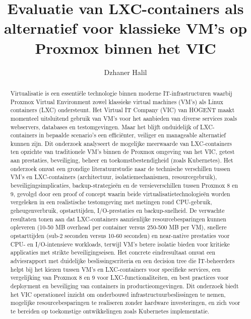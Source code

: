 \documentclass{hogent-article}
\title{Evaluatie van LXC-containers als alternatief voor klassieke VM's op Proxmox binnen het VIC}
\author{Dzhaner Halil}
\begin{document}
\begin{abstract}
Virtualisatie is een essentiële technologie binnen moderne IT-infrastructuren waarbij Proxmox Virtual Environment zowel klassieke virtual machines (VM's) als Linux containers (LXC) ondersteunt. Het Virtual IT Company (VIC) van HOGENT maakt momenteel uitsluitend gebruik van VM's voor het aanbieden van diverse services zoals webservers, databases en testomgevingen. Maar het blijft onduidelijk of LXC-containers in bepaalde scenario's een efficiënter, veiliger en manageable alternatief kunnen zijn. Dit onderzoek analyseert de mogelijke meerwaarde van LXC-containers ten opzichte van traditionele VM's binnen de Proxmox omgeving van het VIC, getest aan prestaties, beveiliging, beheer en toekomstbestendigheid (zoals Kubernetes). Het onderzoek omvat een grondige literatuurstudie naar de technische verschillen tussen VM's en LXC-containers (architectuur, isolatiemechanismen, resourcegebruik), beveiligingsimplicaties, backup-strategieën en de versieverschillen tussen Proxmox 8 en 9, gevolgd door een proof of concept waarin beide virtualisatietechnologieën worden vergeleken in een realistische testomgeving met metingen rond CPU-gebruik, geheugenverbruik, opstarttijden, I/O-prestaties en backup-snelheid. De verwachte resultaten tonen aan dat LXC-containers aanzienlijke resourcebesparingen kunnen opleveren (10-50 MB overhead per container versus 250-500 MB per VM), snellere opstarttijden (sub-2 seconden versus 10-60 seconden) en near-native prestaties voor CPU- en I/O-intensieve workloads, terwijl VM's betere isolatie bieden voor kritieke applicaties met strikte beveiligingseisen. Het concrete eindresultaat omvat een adviesrapport met duidelijke beslissingscriteria en een decision tree die IT-beheerders helpt bij het kiezen tussen VM's en LXC-containers voor specifieke services, een vergelijking van Proxmox 8 en 9 voor LXC-functionaliteiten, en best practices voor deployment en beveiliging van containers in productieomgevingen. Dit onderzoek biedt het VIC operationeel inzicht om onderbouwd infrastructuurbeslissingen te nemen, mogelijke resourcebesparingen te realiseren zonder hardware investeringen, en zich voor te bereiden op toekomstige ontwikkelingen zoals Kubernetes implementatie.
\end{abstract}


\tableofcontents



\printbibliography[heading=bibintoc]
\end{document}
